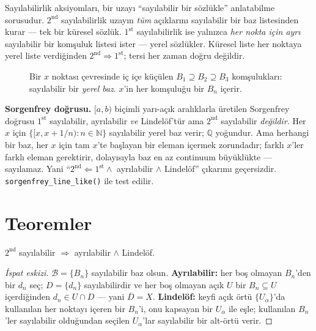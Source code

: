 \begin{sezgi}
Sayılabilirlik aksiyomları, bir uzayı ``sayılabilir bir sözlükle'' anlatabilme
sorusudur. $2^{\text{nd}}$ sayılabilirlik uzayın \emph{tüm} açıklarını sayılabilir
bir baz listesinden kurar --- tek bir küresel sözlük. $1^{\text{st}}$ sayılabilirlik
ise yalnızca \emph{her nokta için ayrı} sayılabilir bir komşuluk listesi ister ---
yerel sözlükler. Küresel liste her noktaya yerel liste verdiğinden
$2^{\text{nd}}\Rightarrow 1^{\text{st}}$; tersi her zaman doğru değildir.
\end{sezgi}

\begin{figure}[ht]
  \centering
  
  \caption{Bir $x$ noktası çevresinde iç içe küçülen $B_1\supseteq B_2\supseteq B_3$
    komşulukları: sayılabilir bir \emph{yerel baz}. $x$'in her komşuluğu bir $B_n$
    içerir.}
  \label{fig:ch09:yerelbaz}
\end{figure}

\begin{karsiornek}
\textbf{Sorgenfrey doğrusu.} $[a,b)$ biçimli yarı-açık aralıklarla üretilen
Sorgenfrey doğrusu $1^{\text{st}}$ sayılabilir, ayrılabilir \emph{ve} Lindelöf'tür
ama $2^{\text{nd}}$ sayılabilir \emph{değildir}. Her $x$ için
$\{[x, x+1/n) : n\in\mathbb{N}\}$ sayılabilir yerel baz verir; $\mathbb{Q}$
yoğundur. Ama herhangi bir baz, her $x$ için tam $x$'te başlayan bir eleman
içermek zorundadır; farklı $x$'ler farklı eleman gerektirir, dolayısıyla baz en
az continuum büyüklükte --- sayılamaz. Yani
``$2^{\text{nd}}\Leftarrow 1^{\text{st}}\wedge$ ayrılabilir $\wedge$ Lindelöf''
çıkarımı geçersizdir. \texttt{sorgenfrey\_line\_like()} ile test edilir.
\end{karsiornek}

\section{Teoremler}

\begin{theorem}
$2^{\text{nd}}$ sayılabilir $\Rightarrow$ ayrılabilir $\wedge$ Lindelöf.
\begin{proof}[İspat eskizi]
$\mathcal{B}=\{B_n\}$ sayılabilir baz olsun. \textbf{Ayrılabilir:} her boş olmayan
$B_n$'den bir $d_n$ seç; $D=\{d_n\}$ sayılabilirdir ve her boş olmayan açık $U$ bir
$B_n\subseteq U$ içerdiğinden $d_n\in U\cap D$ --- yani $\overline{D}=X$.
\textbf{Lindelöf:} keyfi açık örtü $\{U_\alpha\}$'da kullanılan her noktayı içeren
bir $B_n$'i, onu kapsayan bir $U_\alpha$ ile eşle; kullanılan $B_n$'ler sayılabilir
olduğundan seçilen $U_\alpha$'lar sayılabilir bir alt-örtü verir.
\end{proof}
\end{theorem}

